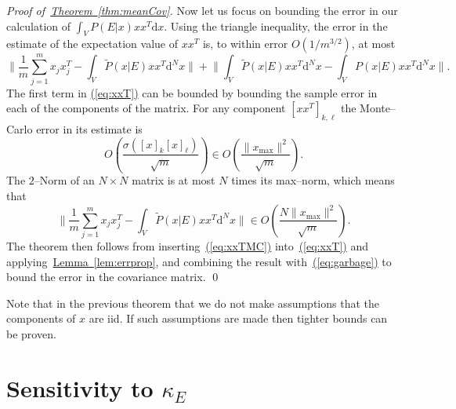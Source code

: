 \documentclass{article} %
\newenvironment{proofof}[1]{\begin{trivlist}\item[]{\flushleft\it
Proof of~#1.}}
{\qed\end{trivlist}}
\newcommand{\eq}[1]{\hyperref[eq:#1]{(\ref*{eq:#1})}}
\newcommand{\thm}[1]{\hyperref[thm:#1]{Theorem~\ref*{thm:#1}}}
\newcommand{\lem}[1]{\hyperref[lem:#1]{Lemma~\ref*{lem:#1}}}
\begin{document}
\begin{proofof}{\thm{meanCov}}
Now let us focus on bounding the error in our calculation of $\int_V P(E|x) xx^T \mathrm{d}x$. Using the triangle inequality, the error in the estimate of the expectation value of $x x^T$ is, to within error $O(1/m^{3/2})$, at most
\begin{equation}
\Biggr\|\frac{1}{m} \sum_{j=1}^m x_j x_j^T - \int_V \tilde{P}(x|E) x x^T\mathrm{d}^Nx\Biggr\|+\Biggr\| \int_V \tilde{P}(x|E) x x^T\mathrm{d}^Nx-\int_V {P}(x|E) x x^T\mathrm{d}^Nx\Biggr\|.\label{eq:xxT}
\end{equation}
The first term in \eq{xxT} can be bounded by bounding the sample error in each of the components of the matrix.  For any component $[xx^T]_{k,\ell}$ the Monte--Carlo error in its estimate is
\begin{equation}
O\left(\frac{\sigma({[x]_k[x]_\ell})}{\sqrt{m}}\right)\in O\left(\frac{\|x_{\max}\|^2}{\sqrt{m}}\right).
\end{equation}
The $2$--Norm of an $N\times N$ matrix is at most $N$ times its max--norm, which means that
\begin{equation}
\Biggr\|\frac{1}{m} \sum_{j=1}^m x_j x_j^T - \int_V \tilde{P}(x|E) x x^T\mathrm{d}^Nx\Biggr\|\in O\left(\frac{N\|x_{\max}\|^2}{\sqrt{m}}\right).\label{eq:xxTMC}
\end{equation}
The theorem then follows from inserting~\eq{xxTMC} into~\eq{xxT} and applying~\lem{errprop}, and combining the result with~\eq{garbage} to bound the error in the covariance matrix.
\end{proofof}

Note that in the previous theorem that we do not make assumptions that the components of $x$ are iid.  If such assumptions are made then tighter bounds can be proven.

\section{Sensitivity to $\kappa_E$}
\label{app:sensitivity-kappa}
\end{document}
